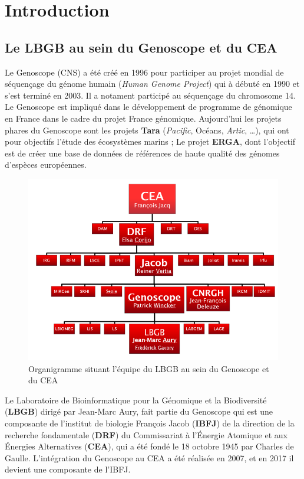 \section{Introduction}
\subsection{Le LBGB au sein du Genoscope et du CEA}
Le Genoscope (CNS) a été créé en 1996 pour participer au projet mondial de séquençage du génome humain (\emph{Human Genome Project}) qui à débuté en 1990 et s'est terminé en 2003. Il a notament participé au séquençage du chromosome 14. Le Genoscope est impliqué dans le développement de programme de génomique en France dans le cadre du projet France génomique. Aujourd'hui les projets phares du Genoscope sont les projets \textbf{Tara} (\emph{Pacific}, Océans, \emph{Artic}, \dots), qui ont pour objectifs l'étude des écosystèmes marins ; Le projet \textbf{ERGA}, dont l'objectif est de créer une base de données de références de haute qualité des génomes d'espèces européennes.

\begin{minipage}{0.45\textwidth}
\begin{figure}[H]
    \includegraphics[width=1.1\textwidth]{img/organigramme.png}
    \caption{Organigramme situant l’équipe du LBGB au sein du Genoscope et du CEA}
    \label{organigramme_LBGB}
\end{figure}
\end{minipage} 
\hfill
\begin{minipage}{0.45\textwidth}
    Le Laboratoire de Bioinformatique pour la Génomique et la Biodiversité (\textbf{LBGB}) dirigé par Jean-Marc Aury, fait partie du Genoscope qui est une composante de l'institut de biologie François Jacob (\textbf{IBFJ}) de la direction de la recherche fondamentale (\textbf{DRF}) du Commissariat à l'Énergie Atomique et aux Énergies Alternatives (\textbf{CEA}), qui a été fondé le 18 octobre 1945 par Charles de Gaulle. L'intégration du Genoscope au CEA a été réalisée en 2007, et en 2017 il devient une composante de l'IBFJ.
\end{minipage}

